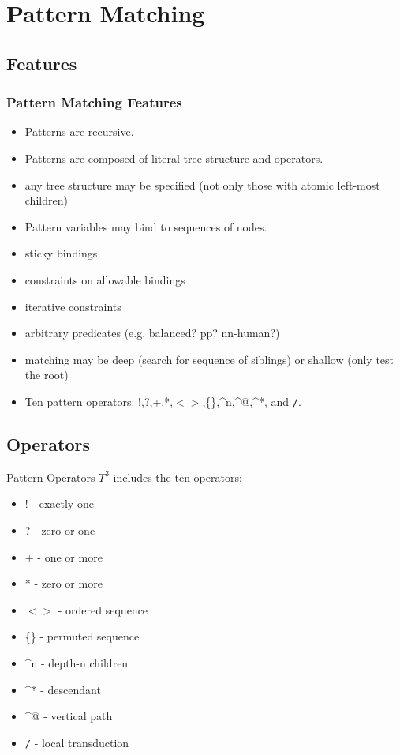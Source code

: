 \documentclass[8pt]{beamer}
\begin{document}
\section{Pattern Matching}
\subsection{Features}
\begin{frame}
  \frametitle{Pattern Matching Features}
  \begin{itemize}
  \item Patterns are recursive.
  \item Patterns are composed of literal tree structure and operators. 
  \item any tree structure may be specified (not only those with atomic left-most children)
  \item Pattern variables may bind to sequences of nodes.
  \item sticky bindings
  \item constraints on allowable bindings
  \item iterative constraints
  \item arbitrary predicates  (e.g. balanced? pp? nn-human?)
  \item matching may be deep (search for sequence of siblings) or shallow (only test the root)     \item Ten pattern operators: !,?,+,*,$<>$,\{\},\^{}n,\^{}@,\^{}*, and \texttt{/}. 
  \end{itemize}
\end{frame}

\subsection{Operators}
\begin{frame}{Pattern Operators}
  $T^3$ includes the ten operators:
  \begin{itemize}
  \item !   - exactly one 
  \item ?   - zero or one
  \item +   - one or more 
  \item *   - zero or more
  \item $<>$  - ordered sequence
  \item \{\}  - permuted sequence
  \item \^{}n - depth-n children
  \item \^{}* - descendant 
  \item \^{}@ - vertical path
  \item \texttt{/} - local transduction
  \end{itemize}
\end{frame}
\end{document}
